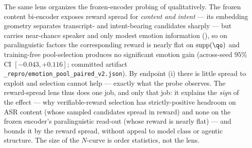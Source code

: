 The same lens organizes the frozen-encoder probing of  qualitatively. The frozen content
bi-encoder exposes reward spread for \emph{content and intent} --- its embedding geometry separates
transcript- and intent-bearing candidates sharply --- but carries near-chance speaker and only modest
emotion information (), so on paralinguistic factors the corresponding reward is nearly
flat on $\mathrm{supp}(\qo)$ and training-free pool-selection produces no significant emotion gain
(across-seed $95\%$ CI $[-0.043,+0.116]$; committed artifact
\texttt{\_repro/emotion\_pool\_paired\_v2.json}). By endpoint (i) there is little spread to exploit and
selection cannot help --- exactly what the probe observes. The reward-spread lens thus does one job, and
only that job: it explains the \emph{sign} of the effect --- why verifiable-reward selection has
strictly-positive headroom on ASR content (whose sampled candidates spread in reward) and none on the
frozen encoder's paralinguistic read-out (whose reward is nearly flat) --- and bounds it by the reward
spread, without appeal to model class or agentic structure. The size of the $N$-curve is order statistics,
not the lens.